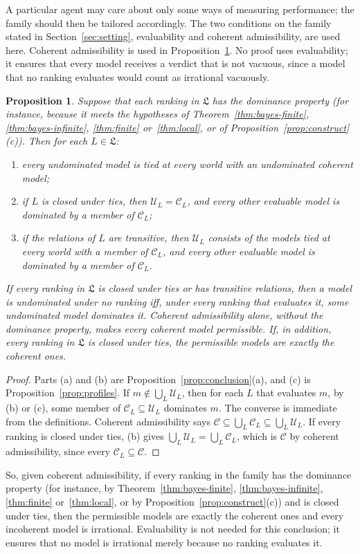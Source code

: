 \documentclass[11pt]{article}
\newtheorem{proposition}[theorem]{Proposition}
\theoremstyle{definition}
\theoremstyle{remark}
\newcommand{\C}{\mathcal C}
\newcommand{\U}{\mathcal U}
\newcommand{\Lf}{\mathfrak L}
\begin{document}
A particular agent may care about only some ways of measuring performance; the family should then be tailored accordingly. The two conditions on the family stated in Section~\ref{sec:setting}, evaluability and coherent admissibility, are used here. Coherent admissibility is used in Proposition~\ref{prop:permissible}. No proof uses evaluability; it ensures that every model receives a verdict that is not vacuous, since a model that no ranking evaluates would count as irrational vacuously.

\begin{proposition}\label{prop:permissible}
Suppose that each ranking in $\Lf$ has the dominance property (for instance, because it meets the hypotheses of Theorem~\ref{thm:bayes-finite}, \ref{thm:bayes-infinite}, \ref{thm:finite} or~\ref{thm:local}, or of Proposition~\ref{prop:construct}(c)). Then for each $L\in\Lf$:
\begin{enumerate}[label=(\alph*)]
\item every undominated model is tied at every world with an undominated coherent model;
\item if $L$ is closed under ties, then $\U_L=\C_L$, and every other evaluable model is dominated by a member of $\C_L$;
\item if the relations of $L$ are transitive, then $\U_L$ consists of the models tied at every world with a member of $\C_L$, and every other evaluable model is dominated by a member of $\C_L$.
\end{enumerate}
If every ranking in $\Lf$ is closed under ties or has transitive relations, then a model is undominated under no ranking iff, under every ranking that evaluates it, some undominated model dominates it. Coherent admissibility alone, without the dominance property, makes every coherent model permissible. If, in addition, every ranking in $\Lf$ is closed under ties, the permissible models are exactly the coherent ones.
\end{proposition}
\begin{proof}
Parts (a) and (b) are Proposition~\ref{prop:conclusion}(a), and (c) is Proposition~\ref{prop:profiles}. If $m\notin\bigcup_L\U_L$, then for each $L$ that evaluates $m$, by (b) or (c), some member of $\C_L\subseteq\U_L$ dominates $m$. The converse is immediate from the definitions. Coherent admissibility says $\C\subseteq\bigcup_L\C_L\subseteq\bigcup_L\U_L$. If every ranking is closed under ties, (b) gives $\bigcup_L\U_L=\bigcup_L\C_L$, which is $\C$ by coherent admissibility, since every $\C_L\subseteq\C$.
\end{proof}
So, given coherent admissibility, if every ranking in the family has the dominance property (for instance, by Theorem~\ref{thm:bayes-finite}, \ref{thm:bayes-infinite}, \ref{thm:finite} or~\ref{thm:local}, or by Proposition~\ref{prop:construct}(c)) and is closed under ties, then the permissible models are exactly the coherent ones and every incoherent model is irrational. Evaluability is not needed for this conclusion; it ensures that no model is irrational merely because no ranking evaluates it.
\end{document}
